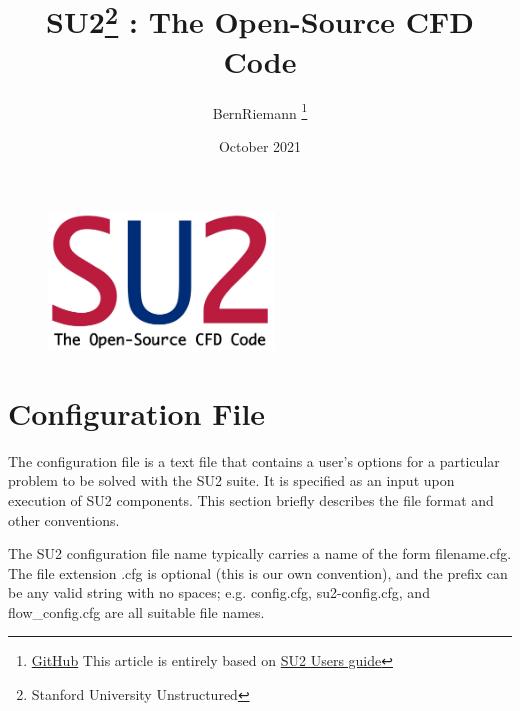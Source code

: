 \documentclass{article}
\title{SU2\footnote{Stanford University Unstructured} : The Open-Source CFD Code }
\author{BernRiemann \footnote{\href{https://github.com/bernriemann/}{GitHub} \newline This article is entirely based on \href{https://su2code.github.io/docs_v7/home/}{SU2 Users guide}} }
\date{October 2021}
\begin{document}
\maketitle

\begin{figure}[h]
    \centering
\end{figure}

\newpage
{}
\begin{figure}
    \centering
    \includegraphics[width=6cm]{Figures/logoSU2_v3_3.png}
\end{figure}
    
\tableofcontents 

\newpage


\section{Configuration File}

The configuration file is a text file that contains a user’s options for a particular problem to be solved with the SU2 suite. It is specified as an input upon execution of SU2 components. This section briefly describes the file format and other conventions.

The SU2 configuration file name typically carries a name of the form filename.cfg. The file extension .cfg is optional (this is our own convention), and the prefix can be any valid string with no spaces; e.g. config.cfg, su2-config.cfg, and flow\_config.cfg are all suitable file names.
\end{document}
